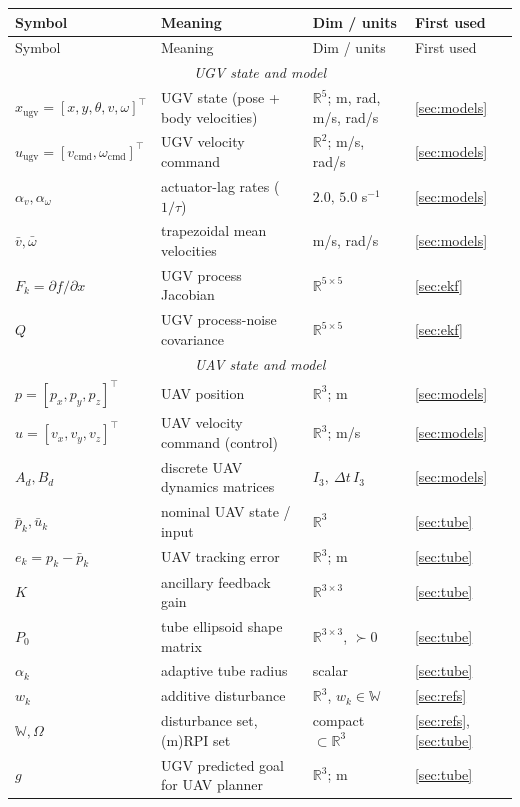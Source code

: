 \documentclass[11pt]{article}
\newcommand{\R}{\mathbb{R}}
\newcommand{\W}{\mathbb{W}}
\newcommand{\bu}{\bar{u}}
\newcommand{\bp}{\bar{p}}
\begin{document}
{\small
\begin{longtable}{@{}l l l l@{}}
\toprule
Symbol & Meaning & Dim / units & First used \\
\midrule
\endfirsthead
\toprule
Symbol & Meaning & Dim / units & First used \\
\midrule
\endhead
\multicolumn{4}{c}{\emph{UGV state and model}} \\
$x_{\text{ugv}}=[x,y,\theta,v,\omega]^\top$ & UGV state (pose + body velocities) & $\R^5$; m, rad, m/s, rad/s & \cref{sec:models} \\
$u_{\text{ugv}}=[v_{\text{cmd}},\omega_{\text{cmd}}]^\top$ & UGV velocity command & $\R^2$; m/s, rad/s & \cref{sec:models} \\
$\alpha_v,\alpha_\omega$ & actuator-lag rates ($1/\tau$) & $2.0,\,5.0$ s$^{-1}$ & \cref{sec:models} \\
$\bar v,\bar\omega$ & trapezoidal mean velocities & m/s, rad/s & \cref{sec:models} \\
$F_k=\partial f/\partial x$ & UGV process Jacobian & $\R^{5\times5}$ & \cref{sec:ekf} \\
$Q$ & UGV process-noise covariance & $\R^{5\times5}$ & \cref{sec:ekf} \\
\midrule
\multicolumn{4}{c}{\emph{UAV state and model}} \\
$p=[p_x,p_y,p_z]^\top$ & UAV position & $\R^3$; m & \cref{sec:models} \\
$u=[v_x,v_y,v_z]^\top$ & UAV velocity command (control) & $\R^3$; m/s & \cref{sec:models} \\
$A_d,B_d$ & discrete UAV dynamics matrices & $I_3,\ \Delta t\,I_3$ & \cref{sec:models} \\
$\bp_k,\bu_k$ & nominal UAV state / input & $\R^3$ & \cref{sec:tube} \\
$e_k=p_k-\bp_k$ & UAV tracking error & $\R^3$; m & \cref{sec:tube} \\
$K$ & ancillary feedback gain & $\R^{3\times3}$ & \cref{sec:tube} \\
$P_0$ & tube ellipsoid shape matrix & $\R^{3\times3}$, $\succ0$ & \cref{sec:tube} \\
$\alpha_k$ & adaptive tube radius & scalar & \cref{sec:tube} \\
$w_k$ & additive disturbance & $\R^3$, $w_k\in\W$ & \cref{sec:refs} \\
$\W,\Omega$ & disturbance set, (m)RPI set & compact $\subset\R^3$ & \cref{sec:refs},\,\cref{sec:tube} \\
$g$ & UGV predicted goal for UAV planner & $\R^3$; m & \cref{sec:tube} \\

\end{longtable}}
\end{document}
